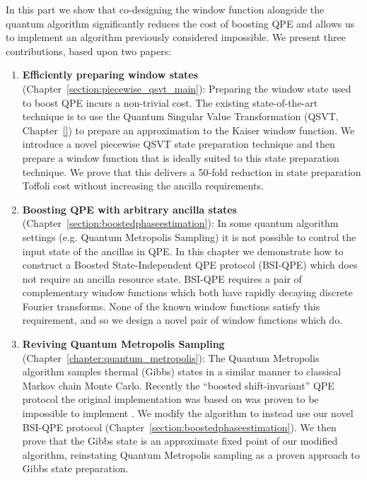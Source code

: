 In this part we show that co-designing the window function alongside the quantum algorithm significantly reduces the cost of boosting QPE and allows us to implement an algorithm previously considered impossible. We present three contributions, based upon two papers:
\begin{enumerate}
    \item \textbf{Efficiently preparing window states} (Chapter~\ref{section:piecewise_qsvt_main}): Preparing the window state used to boost QPE incurs a non-trivial cost. The existing state-of-the-art technique is to use the Quantum Singular Value Transformation (QSVT, Chapter~\ref{}) to prepare an approximation to the Kaiser window function. We introduce a novel piecewise QSVT state preparation technique and then prepare a window function that is ideally suited to this state preparation technique. We prove that this delivers a 50-fold reduction in state preparation Toffoli cost without increasing the ancilla requirements.
    \item \textbf{Boosting QPE with arbitrary ancilla states} (Chapter~\ref{section:boostedphaseestimation}): In some quantum algorithm settings (e.g. Quantum Metropolis Sampling) it is not possible to control the input state of the ancillas in QPE. In this chapter we demonstrate how to construct a Boosted State-Independent QPE protocol (BSI-QPE) which does not require an ancilla resource state. BSI-QPE requires a pair of complementary window functions which both have rapidly decaying discrete Fourier transforms. None of the known window functions satisfy this requirement, and so we design a novel pair of window functions which do.
    \item \textbf{Reviving Quantum Metropolis Sampling} (Chapter~\ref{chapter:quantum_metropolis}): The Quantum Metropolis algorithm \cite{Temme_2011} samples thermal (Gibbs) states in a similar manner to classical Markov chain Monte Carlo. Recently the ``boosted shift-invariant'' QPE protocol the original implementation was based on was proven to be impossible to implement \cite{}. We modify the algorithm to instead use our novel BSI-QPE protocol (Chapter~\ref{section:boostedphaseestimation}). We then prove that the Gibbs state is an approximate fixed point of our modified algorithm, reinstating Quantum Metropolis sampling as a proven approach to Gibbs state preparation.
\end{enumerate}


\chapter{}
\label{chapter:windowed_qpe}

